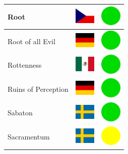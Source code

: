 \documentclass[12pt, a4paper, twoside]{report}
\begin{document}
\begin{center}
\begin{longtable}{|p{5cm}|p{2cm}|p{2cm}|}
 Root                                                       & \includegraphics[width=1cm]{../4x3/cz} &   \includegraphics[width=1cm]{../likes/y} \\ \hline
 Root of all Evil                                           & \includegraphics[width=1cm]{../4x3/de} &   \includegraphics[width=1cm]{../likes/y} \\ \hline
 Rottenness                                                 & \includegraphics[width=1cm]{../4x3/mx} &   \includegraphics[width=1cm]{../likes/y} \\ \hline
 Ruins of Perception                                        & \includegraphics[width=1cm]{../4x3/de} &   \includegraphics[width=1cm]{../likes/y} \\ \hline
 Sabaton                                                    & \includegraphics[width=1cm]{../4x3/se} &   \includegraphics[width=1cm]{../likes/y} \\ \hline
 Sacramentum﻿                                                & \includegraphics[width=1cm]{../4x3/se} &   \includegraphics[width=1cm]{../likes/m} \\ \hline

\end{longtable}
\end{center}
\end{document}
